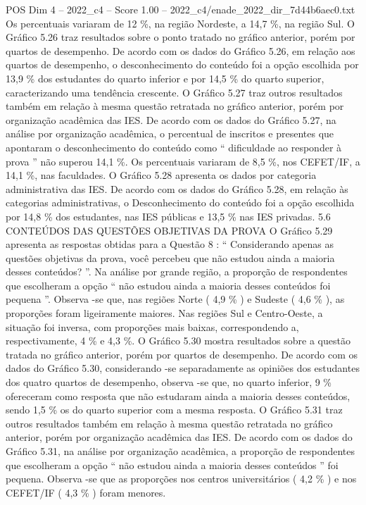 \begin{textsample}{POS Dim 4 – 2022\_c4 – Score 1.00 – 2022\_c4/enade\_2022\_dir\_7d44b6aec0.txt}
Os percentuais variaram de 12 \%, na região Nordeste, a 14,7 \%, na região Sul.
O Gráfico 5.26 traz resultados sobre o ponto tratado no gráfico anterior, porém por quartos de desempenho.
De acordo com os dados do Gráfico 5.26, em relação aos quartos de desempenho, o desconhecimento do conteúdo foi a opção escolhida por 13,9 \% dos estudantes do quarto inferior e por 14,5 \% do quarto superior, caracterizando uma tendência crescente.
O Gráfico 5.27 traz outros resultados também em relação à mesma questão retratada no gráfico anterior, porém por organização acadêmica das IES.
De acordo com os dados do Gráfico 5.27, na análise por organização acadêmica, o percentual de inscritos e presentes que apontaram o desconhecimento do conteúdo como “ dificuldade ao responder à prova ” não superou 14,1 \%.
Os percentuais variaram de 8,5 \%, nos CEFET/IF, a 14,1 \%, nas faculdades.
O Gráfico 5.28 apresenta os dados por categoria administrativa das IES.
De acordo com os dados do Gráfico 5.28, em relação às categorias administrativas, o Desconhecimento do conteúdo foi a opção escolhida por 14,8 \% dos estudantes, nas IES públicas e 13,5 \% nas IES privadas. 5.6 CONTEÚDOS DAS QUESTÕES OBJETIVAS DA PROVA O Gráfico 5.29 apresenta as respostas obtidas para a Questão 8 : “ Considerando apenas as questões objetivas da prova, você percebeu que não estudou ainda a maioria desses conteúdos? ”.
Na análise por grande região, a proporção de respondentes que escolheram a opção “ não estudou ainda a maioria desses conteúdos foi pequena ”.
Observa -se que, nas regiões Norte ( 4,9 \% ) e Sudeste ( 4,6 \% ), as proporções foram ligeiramente maiores.
Nas regiões Sul e Centro-Oeste, a situação foi inversa, com proporções mais baixas, correspondendo a, respectivamente, 4 \% e 4,3 \%.
O Gráfico 5.30 mostra resultados sobre a questão tratada no gráfico anterior, porém por quartos de desempenho.
De acordo com os dados do Gráfico 5.30, considerando -se separadamente as opiniões dos estudantes dos quatro quartos de desempenho, observa -se que, no quarto inferior, 9 \% ofereceram como resposta que não estudaram ainda a maioria desses conteúdos, sendo 1,5 \% os do quarto superior com a mesma resposta.
O Gráfico 5.31 traz outros resultados também em relação à mesma questão retratada no gráfico anterior, porém por organização acadêmica das IES.
De acordo com os dados do Gráfico 5.31, na análise por organização acadêmica, a proporção de respondentes que escolheram a opção “ não estudou ainda a maioria desses conteúdos ” foi pequena.
Observa -se que as proporções nos centros universitários ( 4,2 \% ) e nos CEFET/IF ( 4,3 \% ) foram menores.

\end{textsample}
